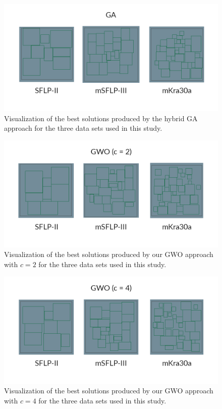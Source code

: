 \begin{figure}[h!]
\centering
\includegraphics[scale=1.85]{./images/chap07-rd/ga-best-solutions.png}
\caption{Visualization of the best solutions produced by the hybrid GA approach for the three data sets used in this study.}
\label{best-results-ga}
\end{figure}

\begin{figure}[h!]
\centering
\includegraphics[scale=1.85]{./images/chap07-rd/gwo-c2-best-solutions.png}
\caption{Visualization of the best solutions produced by our GWO approach with $c=2$ for the three data sets used in this study.}
\label{best-results-gwo-c2}
\end{figure}

\begin{figure}[h!]
\centering
\includegraphics[scale=1.85]{./images/chap07-rd/gwo-c4-best-solutions.png}
\caption{Visualization of the best solutions produced by our GWO approach with $c=4$ for the three data sets used in this study.}
\label{best-results-gwo-c4}
\end{figure}

